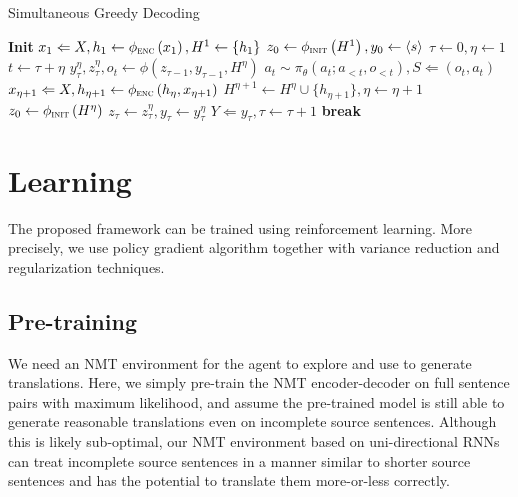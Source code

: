 \begin{algorithm}
\caption{Simultaneous Greedy Decoding}
\label{algo1}
\begin{algorithmic}[1]
{}
\State \textbf{Init} $x_1 \Leftarrow X, h_1 \gets \phi_{\textsc{enc}}\left(x_1\right), H^1 \gets \{h_1\}$
\State \hspace{17pt} $z_0 \gets \phi_{\textsc{init}}\left(H^1\right), y_0 \gets \left<s\right>$
\State \hspace{17pt} $\tau \gets 0, \eta \gets 1$
\State $t \gets \tau + \eta$
\State $y_{\tau}^{\eta}, z_{\tau}^{\eta}, o_t \gets \phi\left(z_{\tau-1}, y_{\tau-1}, H^{\eta}\right)$ 
\State $a_t \sim \pi_{\theta}\left(a_t; a_{<t}, o_{<t}\right), S \Leftarrow (o_t, a_t)$
\State $x_{\eta+1} \Leftarrow X, h_{\eta+1} \gets \phi_{\textsc{enc}}\left(h_{\eta}, x_{\eta+1}\right)$
\State $H^{\eta+1} \gets H^{\eta} \cup \{h_{\eta+1} \}, \eta \gets \eta + 1$
 $z_0 \gets \phi_{\textsc{init}}\left(H^{\eta}\right)$
\EndIf
{}
\State $z_{\tau} \gets z_{\tau}^{\eta}, y_{\tau} \gets y_{\tau}^{\eta}$ 
\State $Y \Leftarrow y_{\tau}, \tau \gets \tau + 1$
 \textbf{break}
\EndIf
\EndIf
\EndWhile
\end{algorithmic}
\end{algorithm}

\section{Learning}
\label{sec:optimization}
The proposed framework can be trained using reinforcement learning. More precisely, we use policy gradient algorithm together with variance reduction and regularization techniques.
\subsection{Pre-training} 
We need an NMT environment for the agent to explore and use to generate translations.
Here, we simply pre-train the NMT encoder-decoder on full sentence pairs with maximum likelihood, and assume the pre-trained model is still able to generate reasonable translations even on incomplete source sentences.
Although this is likely sub-optimal, our NMT environment based on uni-directional RNNs can treat incomplete source sentences in a manner similar to shorter source sentences and has the potential to translate them more-or-less correctly.%

